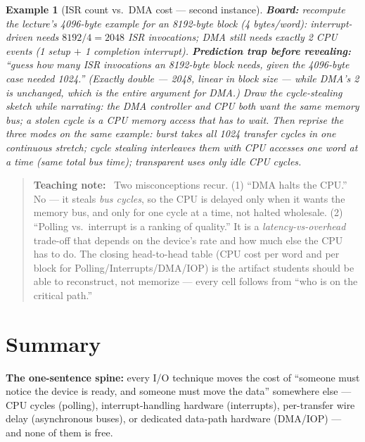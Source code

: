 \documentclass[11pt]{article}
\newtheorem{example}{Example}[section]
\newenvironment{teachingaside}{\begin{quote}\small\color{primary-gold}\textbf{Teaching note:}\ }{\end{quote}}
\begin{document}
\begin{example}[ISR count vs.\ DMA cost --- second instance]
\label{ex:dmaboard}
\textbf{Board:} recompute the lecture's 4096-byte example for an 8192-byte block (4 bytes/word): interrupt-driven needs $8192/4=2048$ ISR invocations; DMA still needs exactly 2 CPU events (1 setup $+$ 1 completion interrupt). \textbf{Prediction trap before revealing:} ``guess how many ISR invocations an 8192-byte block needs, given the 4096-byte case needed 1024.'' (Exactly double --- 2048, linear in block size --- while DMA's 2 is unchanged, which is the entire argument for DMA.) Draw the cycle-stealing sketch while narrating: the DMA controller and CPU both want the same memory bus; a stolen cycle is a CPU memory access that has to wait. Then reprise the three modes on the same example: burst takes all 1024 transfer cycles in one continuous stretch; cycle stealing interleaves them with CPU accesses one word at a time (same total bus time); transparent uses only idle CPU cycles.
\end{example}

\begin{teachingaside}
Two misconceptions recur. (1) ``DMA halts the CPU.'' No --- it steals \emph{bus cycles}, so the CPU is delayed only when it wants the memory bus, and only for one cycle at a time, not halted wholesale. (2) ``Polling vs.\ interrupt is a ranking of quality.'' It is a \emph{latency-vs-overhead} trade-off that depends on the device's rate and how much else the CPU has to do. The closing head-to-head table (CPU cost per word and per block for Polling/Interrupts/DMA/IOP) is the artifact students should be able to reconstruct, not memorize --- every cell follows from ``who is on the critical path.''
\end{teachingaside}

\section{Summary}

\textbf{The one-sentence spine:} every I/O technique moves the cost of ``someone must notice the device is ready, and someone must move the data'' somewhere else --- CPU cycles (polling), interrupt-handling hardware (interrupts), per-transfer wire delay (asynchronous buses), or dedicated data-path hardware (DMA/IOP) --- and none of them is free.
\end{document}
